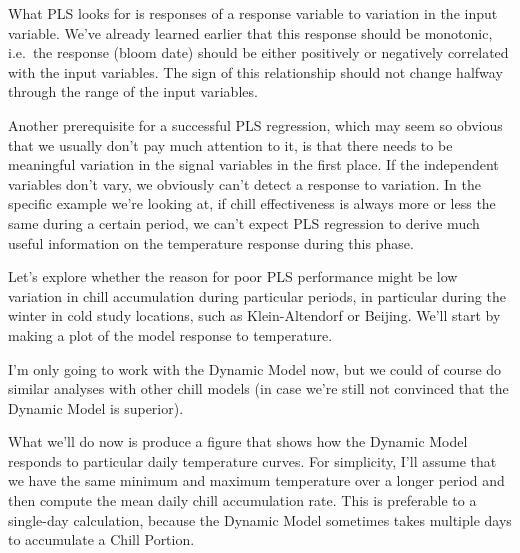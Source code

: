 \documentclass[
]{book}
\begin{document}
What PLS looks for is responses of a response variable to variation in the input variable. We've already learned earlier that this response should be monotonic, i.e.~the response (bloom date) should be either positively or negatively correlated with the input variables. The sign of this relationship should not change halfway through the range of the input variables.

Another prerequisite for a successful PLS regression, which may seem so obvious that we usually don't pay much attention to it, is that there needs to be meaningful variation in the signal variables in the first place. If the independent variables don't vary, we obviously can't detect a response to variation. In the specific example we're looking at, if chill effectiveness is always more or less the same during a certain period, we can't expect PLS regression to derive much useful information on the temperature response during this phase.

Let's explore whether the reason for poor PLS performance might be low variation in chill accumulation during particular periods, in particular during the winter in cold study locations, such as Klein-Altendorf or Beijing. We'll start by making a plot of the model response to temperature.

I'm only going to work with the Dynamic Model now, but we could of course do similar analyses with other chill models (in case we're still not convinced that the Dynamic Model is superior).

What we'll do now is produce a figure that shows how the Dynamic Model responds to particular daily temperature curves. For simplicity, I'll assume that we have the same minimum and maximum temperature over a longer period and then compute the mean daily chill accumulation rate. This is preferable to a single-day calculation, because the Dynamic Model sometimes takes multiple days to accumulate a Chill Portion.
\end{document}
